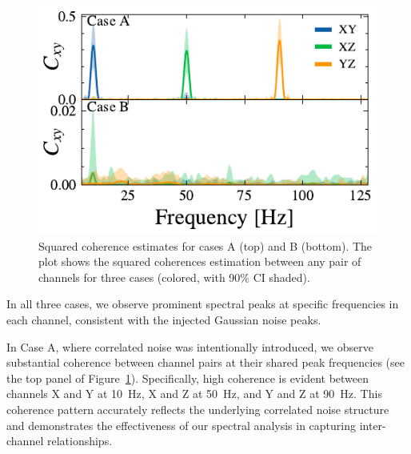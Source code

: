 \documentclass[%
 reprint,
 amsmath,amssymb,
 aps,
 nofootinbib,
]{revtex4-2}
\begin{document}
\begin{figure}
  \includegraphics[width=\columnwidth]{caseAB_coh.pdf}
  \caption{Squared coherence estimates for cases A (top) and B (bottom). The plot shows the squared coherences estimation between any pair of channels for three cases (colored, with 90\% CI shaded).}
  \label{fig:squared_coh}
\end{figure}


In all three cases, we observe prominent spectral peaks at specific frequencies in each channel, consistent with the injected Gaussian noise peaks.

In Case A, where correlated noise was intentionally introduced, we observe substantial coherence between channel pairs at their shared peak frequencies (see the top panel of Figure~\ref{fig:squared_coh}). 
Specifically, high coherence is evident between channels X and Y at \SI{10}{Hz}, X and Z at \SI{50}{Hz}, and Y and Z at \SI{90}{Hz}. 
This coherence pattern accurately reflects the underlying correlated noise structure and demonstrates the effectiveness of our spectral analysis in capturing inter-channel relationships.
\end{document}
